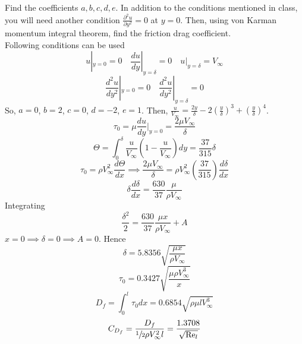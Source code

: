 \documentclass[12pt, twocolumn, letterpaper]{article}
\begin{document}
Find the coefficients $a,b,c,d,e$. In addition to the conditions mentioned in class, you will need another condition $\frac{\partial^2u}{\partial y^2}=0$ at $y=0$. Then, using von Karman momentum integral theorem, find the friction drag coefficient.\\
Following conditions can be used
\begin{equation*}
    u|_{y=0}=0\quad\frac{du}{dy}|_{y=\delta}=0\quad u|_{y=\delta}=V_\infty
\end{equation*}
\begin{equation*}
    \frac{d^2u}{dy^2}|_{y=0}=0\quad\frac{d^2u}{dy^2}|_{y=\delta}=0
\end{equation*}
So, $a=0$, $b=2$, $c=0$, $d=-2$, $e=1$. Then, $\frac{u}{V_\infty}=\frac{2y}{\delta}-2\left(\frac{y}{\delta}\right)^3+\left(\frac{y}{\delta}\right)^4$.
\begin{equation*}
    \tau_0=\mu\frac{du}{dy}|_{y=0}=\frac{2\mu V_\infty}{\delta}
\end{equation*}
\begin{equation*}
    \Theta=\int_0^\delta\frac{u}{V_\infty}\left(1-\frac{u}{V_\infty}\right)dy=\frac{37}{315}\delta
\end{equation*}
\begin{equation*}
    \tau_0=\rho V_\infty^2\frac{d\Theta}{dx}\implies\frac{2\mu V_\infty}{\delta}=\rho V_\infty^2\left(\frac{37}{315}\right)\frac{d\delta}{dx}
\end{equation*}
\begin{equation*}
    \delta\frac{d\delta}{dx}=\frac{630}{37}\frac{\mu}{\rho V_\infty}
\end{equation*}
Integrating
\begin{equation*}
    \frac{\delta^2}{2}=\frac{630}{37}\frac{\mu x}{\rho V_\infty}+A
\end{equation*}
$x=0\implies\delta=0\implies A=0$. Hence
\begin{equation*}
    \delta=5.8356\sqrt{\frac{\mu x}{\rho V_\infty}}
\end{equation*}
\begin{equation*}
    \tau_0=0.3427\sqrt{\frac{\mu\rho V_\infty^3}{x}}
\end{equation*}
\begin{equation*}
    D_f=\int_0^l\tau_0dx=0.6854\sqrt{\rho\mu l V_\infty^3}
\end{equation*}
\begin{equation*}
    C_{D_f}=\frac{D_f}{\sfrac{1}{2}\rho V_\infty^2 l}=\frac{1.3708}{\sqrt{\text{Re}_l}}
\end{equation*}
\end{document}
